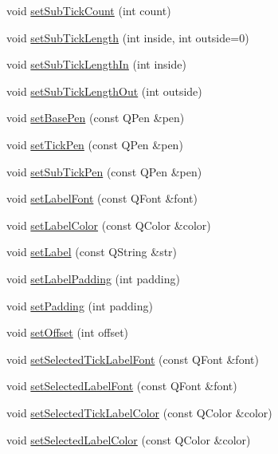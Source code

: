 \begin{DoxyCompactItemize}
\item 
void \hyperlink{classQCPAxis_a4b1554ead9d7f9799650d51383e326dd}{set\-Sub\-Tick\-Count} (int count)
\item 
void \hyperlink{classQCPAxis_ab702d6fd42fc620607435339a1c2a2e1}{set\-Sub\-Tick\-Length} (int inside, int outside=0)
\item 
void \hyperlink{classQCPAxis_ac46fa2a993a9f5789540977610acf1de}{set\-Sub\-Tick\-Length\-In} (int inside)
\item 
void \hyperlink{classQCPAxis_a4c6dfc3963492ed72a77724012df5f23}{set\-Sub\-Tick\-Length\-Out} (int outside)
\item 
void \hyperlink{classQCPAxis_a778d45fb71b3c7ab3bb7079e18b058e4}{set\-Base\-Pen} (const \-Q\-Pen \&pen)
\item 
void \hyperlink{classQCPAxis_ad80923bcc1c5da4c4db602c5325e797e}{set\-Tick\-Pen} (const \-Q\-Pen \&pen)
\item 
void \hyperlink{classQCPAxis_aede4028ae7516bd51a60618a8233f9cf}{set\-Sub\-Tick\-Pen} (const \-Q\-Pen \&pen)
\item 
void \hyperlink{classQCPAxis_a71ac1a47f7547e490a8c4311d1433cf3}{set\-Label\-Font} (const \-Q\-Font \&font)
\item 
void \hyperlink{classQCPAxis_a6c906fe56d75f0122335b9f79b999608}{set\-Label\-Color} (const \-Q\-Color \&color)
\item 
void \hyperlink{classQCPAxis_a33bcc382c111c9f31bb0687352a2dea4}{set\-Label} (const \-Q\-String \&str)
\item 
void \hyperlink{classQCPAxis_a4391192a766e5d20cfe5cbc17607a7a2}{set\-Label\-Padding} (int padding)
\item 
void \hyperlink{classQCPAxis_a5691441cb3de9e9844855d339c0db279}{set\-Padding} (int padding)
\item 
void \hyperlink{classQCPAxis_a04a652603cbe50eba9969ee6d68873c3}{set\-Offset} (int offset)
\item 
void \hyperlink{classQCPAxis_a845ccb560b7bc5281098a5be494145f6}{set\-Selected\-Tick\-Label\-Font} (const \-Q\-Font \&font)
\item 
void \hyperlink{classQCPAxis_a02ec2a75d4d8401eaab834fbc6803d30}{set\-Selected\-Label\-Font} (const \-Q\-Font \&font)
\item 
void \hyperlink{classQCPAxis_a9bdbf5e63ab15187f3a1de9440129227}{set\-Selected\-Tick\-Label\-Color} (const \-Q\-Color \&color)
\item 
void \hyperlink{classQCPAxis_a5d502dec597c634f491fdd73d151c72d}{set\-Selected\-Label\-Color} (const \-Q\-Color \&color)

\end{DoxyCompactItemize}
